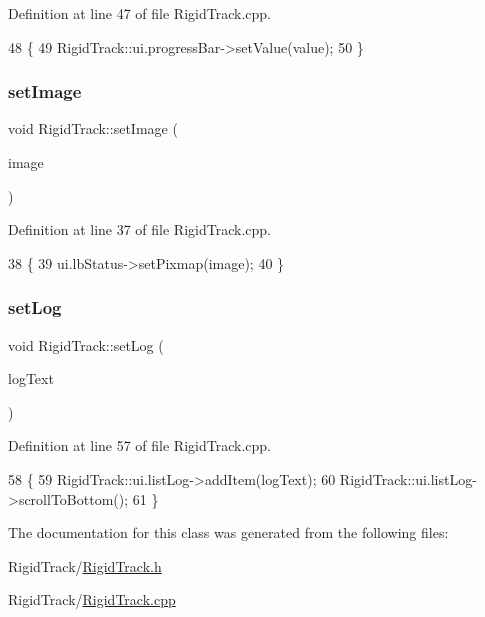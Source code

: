 Definition at line 47 of file Rigid\+Track.\+cpp.


\begin{DoxyCode}
48 \{
49     RigidTrack::ui.progressBar->setValue(value);
50 \}
\end{DoxyCode}
\mbox{\label{class_rigid_track_a3b0b3835204cad40abdb144d24aefc76}} 
\subsubsection{\texorpdfstring{set\+Image}{setImage}}
{\footnotesize\ttfamily void Rigid\+Track\+::set\+Image (\begin{DoxyParamCaption}\item[{Q\+Pixmap}]{image }\end{DoxyParamCaption})\hspace{0.3cm}{\ttfamily [slot]}}



Definition at line 37 of file Rigid\+Track.\+cpp.


\begin{DoxyCode}
38 \{
39     ui.lbStatus->setPixmap(image);
40 \}
\end{DoxyCode}
\mbox{\label{class_rigid_track_a54a029af74a21f92749e99df7ed847b2}} 
\subsubsection{\texorpdfstring{set\+Log}{setLog}}
{\footnotesize\ttfamily void Rigid\+Track\+::set\+Log (\begin{DoxyParamCaption}\item[{Q\+String}]{log\+Text }\end{DoxyParamCaption})\hspace{0.3cm}{\ttfamily [slot]}}



Definition at line 57 of file Rigid\+Track.\+cpp.


\begin{DoxyCode}
58 \{
59     RigidTrack::ui.listLog->addItem(logText);
60     RigidTrack::ui.listLog->scrollToBottom();
61 \}
\end{DoxyCode}


The documentation for this class was generated from the following files\+:\begin{DoxyCompactItemize}
\item 
Rigid\+Track/\hyperlink{_rigid_track_8h}{Rigid\+Track.\+h}\item 
Rigid\+Track/\hyperlink{_rigid_track_8cpp}{Rigid\+Track.\+cpp}\end{DoxyCompactItemize}
